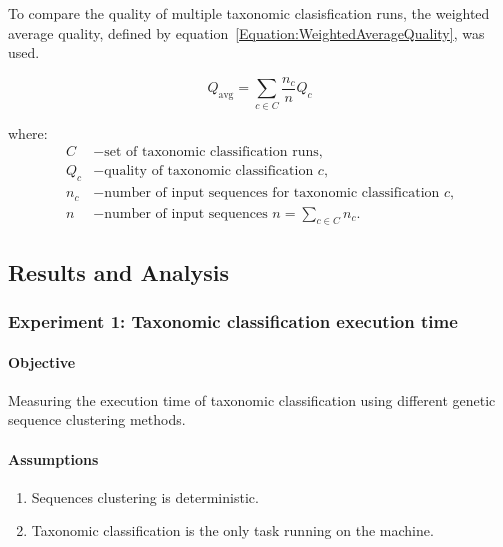 \documentclass[pdflatex,sn-vancouver-num]{sn-jnl}%
\begin{document}
            To compare the quality of multiple taxonomic clasisfication runs, the weighted average quality, defined by equation~\ref{Equation:WeightedAverageQuality}, was used.
            
            \begin{equation}
                Q_{\text{avg}} = \sum_{c \in C} \frac{n_c}{n} Q_c
                \label{Equation:WeightedAverageQuality}
            \end{equation}

            where:
            \begin{align*}
            C &- \text{set of taxonomic classification runs,} \\
            Q_c &- \text{quality of taxonomic classification $c$,} \\
            n_c &- \text{number of input sequences for taxonomic classification $c$,}\\
            n   &- \text{number of input sequences $n = \sum_{c \in C} n_{c}.$}
            \end{align*}

        \subsection{Results and Analysis}
            \subsubsection{Experiment 1: Taxonomic classification execution time}
                \paragraph{Objective} 
                Measuring the execution time of taxonomic classification using different genetic sequence clustering methods.

                \paragraph{Assumptions}
                \begin{enumerate}
                    \item {
                        Sequences clustering is deterministic.
                    }
                    \item {
                        Taxonomic classification is the only task running on the machine.
                    }
                \end{enumerate}
\end{document}
